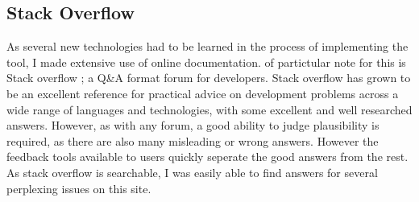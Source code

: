 \subsection{Stack Overflow}
As several new technologies had to be learned in the process of implementing the tool, I made extensive use of online documentation. of partictular note for this is Stack overflow \cite{stack2013overflow}; a Q\&A format forum for developers. Stack overflow has grown to be an excellent reference for practical advice on development problems across a wide range of languages and technologies, with some excellent and well researched answers. However, as with any forum, a good ability to judge plausibility is required, as there are also many misleading or wrong answers. However the feedback tools available to users quickly seperate the good answers from the rest. As stack overflow is searchable, I was easily able to find answers for several perplexing issues on this site. 